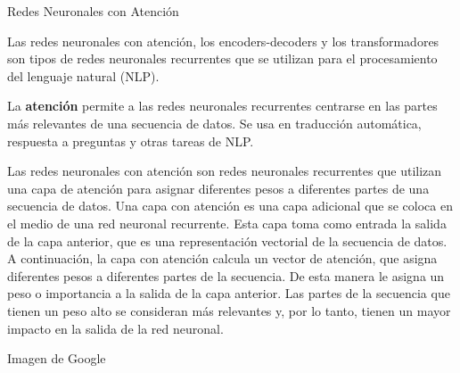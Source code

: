 \documentclass[10pd,hyperref={colorlinks=true}]{beamer}
\begin{document}
 \begin{frame}{Redes Neuronales con Atención}

Las redes neuronales con atención, los encoders-decoders y los 
transformadores son tipos de redes neuronales recurrentes que se 
utilizan para el procesamiento del lenguaje natural (NLP).

La {\bf atención} permite a las redes neuronales recurrentes centrarse
en las partes más relevantes de una secuencia de datos. Se usa en 
traducción automática, respuesta a preguntas y otras tareas de NLP.

Las redes neuronales con atención son redes neuronales recurrentes que 
utilizan una capa de atención para asignar diferentes pesos a diferentes 
partes de una secuencia de datos.  Una capa con atención es una capa 
adicional que se coloca en el medio de una red neuronal recurrente. Esta 
capa toma como entrada la salida de la capa anterior, que es una 
representación vectorial de la secuencia de datos. A continuación, la 
capa con atención calcula un vector de atención, que asigna diferentes 
pesos a diferentes partes de la secuencia. De esta manera le asigna un 
peso o importancia a la salida de la capa anterior. Las partes de la 
secuencia que tienen un peso alto se consideran más relevantes y, por lo 
tanto, tienen un mayor impacto en la salida de la red neuronal.

 \end{frame}


 \begin{frame}{}

 \vfill
 \centerline{}
 \vfill
 \centerline{\tiny Imagen de Google}
 \vfill

 \end{frame}

\end{document}
